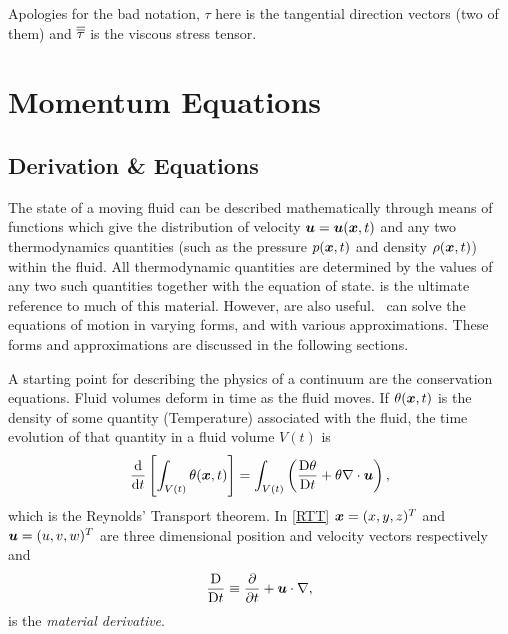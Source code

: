 Apologies for the bad notation, $\tau$ here is the tangential direction
vectors (two of them) and $\overline{\overline{\tau}}$ is the viscous stress tensor.

\section{Momentum Equations}\label{Sect:MP-MomEqn}

\subsection{Derivation \& Equations}

The state of a moving fluid can be described mathematically through means of
functions which give the distribution of velocity ${\mbox{\boldmath$u$}}={\mbox{\boldmath$u$}}({\mbox{\boldmath$x$}},t)$ and
any two thermodynamics quantities (such as the pressure $p({\mbox{\boldmath$x$}},t)$ and
density $\rho({\mbox{\boldmath$x$}},t)$) within the fluid. All thermodynamic quantities are
determined by the values of any two such quantities together with the
equation of state. \citet{batchelor1967} is the ultimate reference to much of this
material. However, \cite{landau,cushman1994,panton2006,vallis2006,gill1982} are also
useful. \fluidity\ can solve the equations of motion in varying forms, and
with various approximations. These forms and approximations are discussed in
the following sections.


A starting point for describing the physics of a continuum are the conservation equations. Fluid volumes deform in time as the fluid moves. If $\theta({\mbox{\boldmath$x$}},t)$ is the density of some quantity (\eg Temperature) associated with the fluid, the time evolution of that quantity in a fluid volume $V(t)$ is 
\begin{equation}\label{RTT}
 \frac{\mathrm{d}}{\mathrm{d} t}\left[\int_{V(t)}\theta({\mbox{\boldmath$x$}},t)\right]=
 \int_{V(t)}\left(\frac{\mathrm{D}\theta}{\mathrm{D} t}+\theta\nabla\cdot{\mbox{\boldmath$u$}}\right),
\end{equation}
which is the Reynolds' Transport theorem. In \eqref{RTT} ${\mbox{\boldmath$x$}}=(x,y,z)^T$ and ${\mbox{\boldmath$u$}}=(u,v,w)^T$ are three dimensional position and velocity vectors respectively and 
\begin{equation}\label{MatDiv}
 \frac{\mathrm{D}}{\mathrm{D} t}\equiv\frac{\partial}{\partial{t}}+{\mbox{\boldmath$u$}}\cdot\nabla,
\end{equation}
is the \textit{material derivative}.

